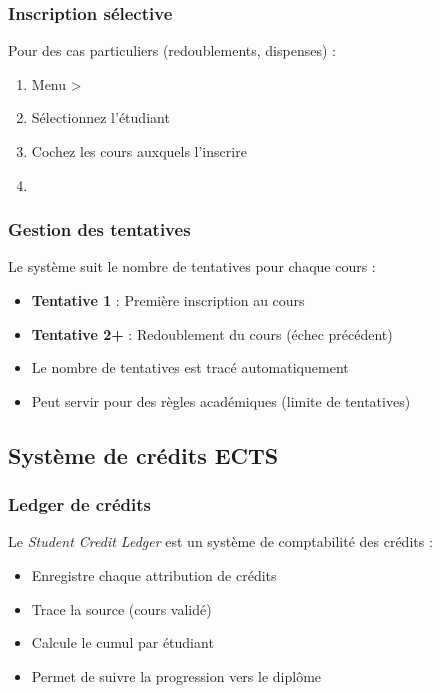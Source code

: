 \subsubsection{Inscription sélective}

Pour des cas particuliers (redoublements, dispenses) :

\begin{enumerate}[leftmargin=*]
    \item Menu  > 
    \item Sélectionnez l'étudiant
    \item Cochez les cours auxquels l'inscrire
    \item {}
\end{enumerate}

\subsubsection{Gestion des tentatives}

Le système suit le nombre de tentatives pour chaque cours :

\begin{itemize}[leftmargin=*]
    \item \textbf{Tentative 1} : Première inscription au cours
    \item \textbf{Tentative 2+} : Redoublement du cours (échec précédent)
    \item Le nombre de tentatives est tracé automatiquement
    \item Peut servir pour des règles académiques (limite de tentatives)
\end{itemize}

\subsection{Système de crédits ECTS}

\subsubsection{Ledger de crédits}

Le \textit{Student Credit Ledger} est un système de comptabilité des crédits :

\begin{itemize}[leftmargin=*]
    \item Enregistre chaque attribution de crédits
    \item Trace la source (cours validé)
    \item Calcule le cumul par étudiant
    \item Permet de suivre la progression vers le diplôme
\end{itemize}

